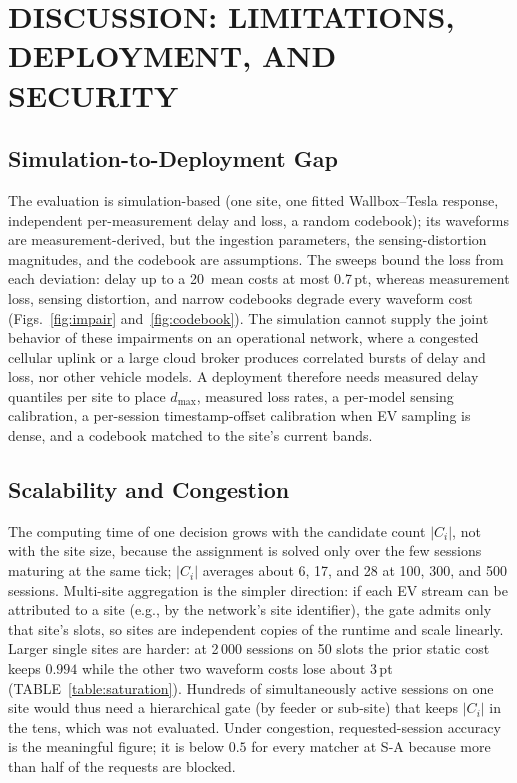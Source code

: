 \documentclass{ieeeaccess}
\newif\ifhighlight \highlightfalse
\DeclareRobustCommand{\revised}[1]{\ifhighlight{\color{blue}#1}\else{\color{.}#1}\fi}
\begin{document}
    \section{\revised{DISCUSSION: LIMITATIONS, DEPLOYMENT, AND SECURITY}}

    \subsection{\revised{Simulation-to-Deployment Gap}}
    \revised{The evaluation is simulation-based (one site, one fitted Wallbox--Tesla response, independent per-measurement delay and loss, a random codebook); its waveforms are measurement-derived, but the ingestion parameters, the sensing-distortion magnitudes, and the codebook are assumptions.
    The sweeps bound the loss from each deviation: delay up to a 20\,\text{sec} mean costs at most 0.7\,pt, whereas measurement loss, sensing distortion, and narrow codebooks degrade every waveform cost (Figs.~\ref{fig:impair} and~\ref{fig:codebook}).
    The simulation cannot supply the joint behavior of these impairments on an operational network, where a congested cellular uplink or a large cloud broker produces correlated bursts of delay and loss, nor other vehicle models.
    A deployment therefore needs measured delay quantiles per site to place $d_{\max}$, measured loss rates, a per-model sensing calibration, a per-session timestamp-offset calibration when EV sampling is dense, and a codebook matched to the site's current bands.}

    \subsection{\revised{Scalability and Congestion}}
    \revised{The computing time of one decision grows with the candidate count $|C_i|$, not with the site size, because the assignment is solved only over the few sessions maturing at the same tick; $|C_i|$ averages about 6, 17, and 28 at 100, 300, and 500 sessions.
    Multi-site aggregation is the simpler direction: if each EV stream can be attributed to a site (e.g., by the network's site identifier), the gate admits only that site's slots, so sites are independent copies of the runtime and scale linearly.
    Larger single sites are harder: at 2\,000 sessions on 50 slots the prior static cost keeps $0.994$ while the other two waveform costs lose about 3\,pt (TABLE~\ref{table:saturation}).
    Hundreds of simultaneously active sessions on one site would thus need a hierarchical gate (by feeder or sub-site) that keeps $|C_i|$ in the tens, which was not evaluated.
    Under congestion, requested-session accuracy is the meaningful figure; it is below $0.5$ for every matcher at S-A because more than half of the requests are blocked.}
\end{document}
